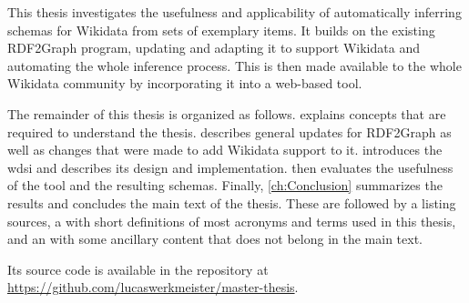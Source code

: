 This thesis investigates the usefulness and applicability
of automatically inferring \glspl{schema} for \gls{Wikidata} from sets of exemplary \glspl{item}.
It builds on the existing \gls{RDF2Graph} \cite{vanDam2015} program,
updating and adapting it to support \gls{Wikidata}
and automating the whole inference process.
This is then made available to the whole \gls{Wikidata} community
by incorporating it into a web-based tool.

The remainder of this thesis
is organized as follows.
 explains concepts that are required
to understand the thesis.
 describes general updates for \gls{RDF2Graph}
as well as changes that were made to add \gls{Wikidata} support to it.
 introduces the \gls{wdsi}
and describes its design and implementation.
 then evaluates the usefulness of the tool and the resulting \glspl{schema}.
Finally, \cref{ch:Conclusion} summarizes the results and concludes the main text of the thesis.
These are followed by a  listing sources,
a  with short definitions of most acronyms and terms used in this thesis,
and an  with some ancillary content that does not belong in the main text.

\doclicenseLongText
Its source code is available in the repository at
\url{https://github.com/lucaswerkmeister/master-thesis}.
